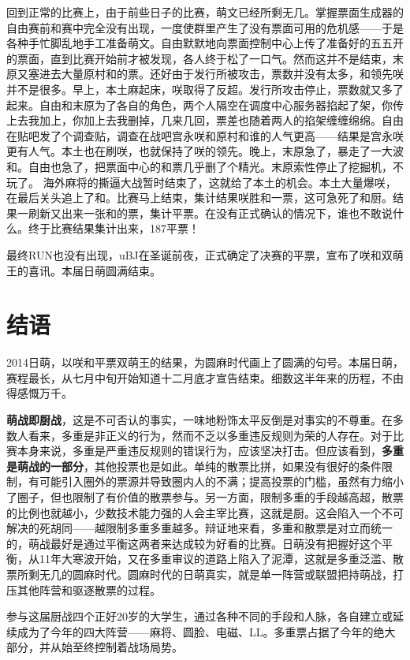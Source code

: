 回到正常的比赛上，由于前些日子的比赛，萌文已经所剩无几。掌握票面生成器的自由赛前和赛中完全没有出现，一度使群里产生了没有票面可用的危机感——于是各种手忙脚乱地手工准备萌文。自由默默地向票面控制中心上传了准备好的五五开的票面，直到比赛开始前才被发现，各人终于松了一口气。然而这并不是结束，末原又塞进去大量原村和的票。还好由于发行所被攻击，票数并没有太多，和领先咲并不是很多。早上，本土麻起床，咲取得了反超。发行所攻击停止，票数就又多了起来。自由和末原为了各自的角色，两个人隔空在调度中心服务器掐起了架，你传上去我加上，你加上去我删掉，几来几回，票差也随着两人的掐架缠缠绵绵。自由在贴吧发了个调查贴，调查在战吧宫永咲和原村和谁的人气更高——结果是宫永咲更有人气。本土也在刷咲，也就保持了咲的领先。晚上，末原急了，暴走了一大波和。自由也急了，把票面中心的和票几乎删了个精光。末原索性停止了挖掘机，不玩了。
海外麻将的撕逼大战暂时结束了，这就给了本土的机会。本土大量爆咲，在最后关头追上了和。比赛马上结束，集计结果咲胜和一票，这可急死了和厨。结果一刷新又出来一张和的票，集计平票。在没有正式确认的情况下，谁也不敢说什么。终于比赛结果集计出来，187平票！

最终RUN也没有出现，uBJ在圣诞前夜，正式确定了决赛的平票，宣布了咲和双萌王的喜讯。本届日萌圆满结束。

\section{结语}

2014日萌，以咲和平票双萌王的结果，为圆麻时代画上了圆满的句号。本届日萌，赛程最长，从七月中旬开始知道十二月底才宣告结束。细数这半年来的历程，不由得感慨万千。

\textbf{萌战即厨战}，这是不可否认的事实，一味地粉饰太平反倒是对事实的不尊重。在多数人看来，多重是非正义的行为，然而不乏以多重违反规则为荣的人存在。对于比赛本身来说，多重是严重违反规则的错误行为，应该坚决打击。但应该看到，\textbf{多重是萌战的一部分}，其他投票也是如此。单纯的散票比拼，如果没有很好的条件限制，有可能引入圈外的票源并导致圈内人的不满；提高投票的门槛，虽然有力缩小了圈子，但也限制了有价值的散票参与。另一方面，限制多重的手段越高超，散票的比例也就越小，少数技术能力强的人会主宰比赛，这就是厨。这会陷入一个不可解决的死胡同——越限制多重多重越多。辩证地来看，多重和散票是对立而统一的，萌战最好是通过平衡这两者来达成较为好看的比赛。日萌没有把握好这个平衡，从11年大寒波开始，又在多重审议的道路上陷入了泥潭，这就是多重泛滥、散票所剩无几的圆麻时代。圆麻时代的日萌真实，就是单一阵营或联盟把持萌战，打压其他阵营和驱逐散票的过程。

参与这届厨战四个正好20岁的大学生，通过各种不同的手段和人脉，各自建立或延续成为了今年的四大阵营——麻将、圆脸、电磁、LL。多重票占据了今年的绝大部分，并从始至终控制着战场局势。


